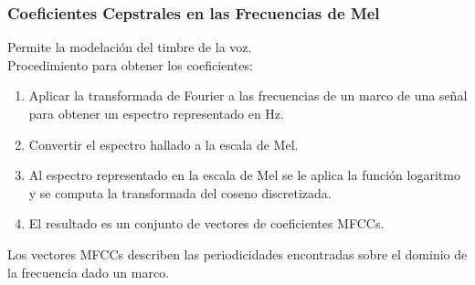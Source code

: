 \documentclass[
10pt, %
aspectratio=169, %
]{beamer}
\begin{document}
	\begin{frame}
		
		\frametitle{Coeﬁcientes Cepstrales en las Frecuencias de Mel}
		
		Permite la modelación del timbre de la voz. \\[5mm]

		Procedimiento para obtener los coeficientes:
		\begin{enumerate}
			\item Aplicar la transformada de Fourier a las frecuencias de un marco de una señal para obtener un espectro representado en Hz.
			
			\item Convertir el espectro hallado a la escala de Mel.
			
			\item Al espectro representado en la escala de Mel se le aplica la función logaritmo y se computa la transformada del coseno discretizada.
			
			\item El resultado es un conjunto de vectores de coeficientes MFCCs.\\[4mm]
		\end{enumerate} 
		
		\pause
		Los vectores MFCCs describen las periodicidades encontradas sobre el dominio de la frecuencia dado un marco. 

	
	\end{frame}
	
\end{document}
